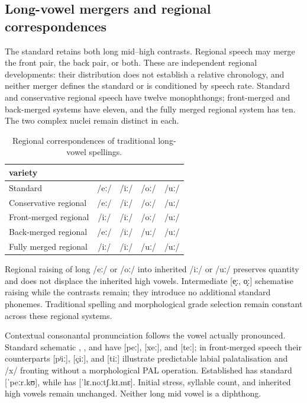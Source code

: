 \subsection{Long-vowel mergers and regional correspondences}\label{sec:long-vowel-mergers}

The standard retains both long mid--high contrasts. Regional speech may
merge the front pair, the back pair, or both. These are independent regional
developments: their distribution does not establish a relative chronology,
and neither merger defines the standard or is conditioned by speech rate.
Standard and conservative regional speech have twelve monophthongs;
front-merged and back-merged systems have eleven, and the fully merged
regional system has ten. The two complex nuclei remain distinct in each.

\begin{table}[htbp]
\footnotesize
\caption{Regional correspondences of traditional long-vowel spellings.}
\label{tab:long-vowel-dialects}
\begin{tabularx}{\textwidth}{l C C C C}
\toprule
{\sc variety} &  &  &  &  \\
\midrule
Standard & /eː/ & /iː/ & /oː/ & /uː/ \\
Conservative regional & /eː/ & /iː/ & /oː/ & /uː/ \\
Front-merged regional & /iː/ & /iː/ & /oː/ & /uː/ \\
Back-merged regional & /eː/ & /iː/ & /uː/ & /uː/ \\
Fully merged regional & /iː/ & /iː/ & /uː/ & /uː/ \\
\bottomrule
\end{tabularx}
\end{table}

Regional raising of long /eː/ or /oː/ into inherited /iː/ or /uː/
preserves quantity and does not displace the inherited high vowels.
Intermediate [e̝ː, o̝ː] schematise raising while the contrasts remain;
they introduce no additional standard phonemes. Traditional spelling and
morphological grade selection remain constant across these regional systems.

Contextual consonantal pronunciation follows the vowel actually pronounced.
Standard schematic , , and  have
[peː], [xeː], and [teː]; in front-merged speech their counterparts
[pʲiː], [çiː], and [tiː] illustrate predictable labial palatalisation
and /x/ fronting without a morphological PAL operation. Established
  has standard [ˈpeːr.kʊ],
while   has [ˈlɛ.noːtʃ.kɪ.mɛ].
Initial stress, syllable count, and inherited high vowels remain unchanged.
Neither long mid vowel is a diphthong.

